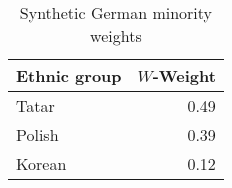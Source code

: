 \begin{table}[t]

\caption{\label{tab:sc_weights}Synthetic German minority weights}
\centering
\begin{tabular}{lr}
\toprule
Ethnic group & $W$-Weight\\
\midrule
Tatar & 0.49\\
Polish & 0.39\\
Korean & 0.12\\
\bottomrule
\end{tabular}
\end{table}